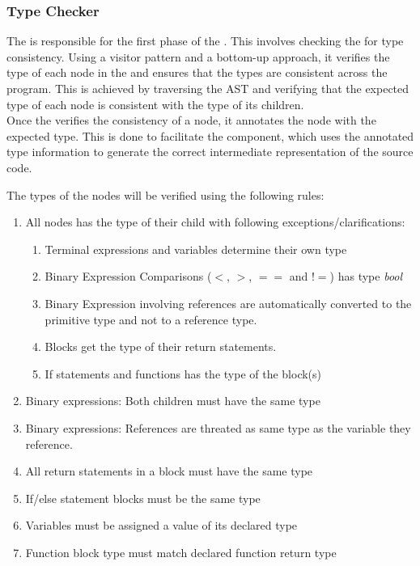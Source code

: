\subsubsection{Type Checker}

The \typeChecker{} is responsible for the first phase of the \static. This involves
checking the \ast{} for type consistency. Using a visitor pattern and a bottom-up
approach, it verifies the type of each node in the \ast{} and ensures that the types
are consistent across the program. This is achieved by traversing the AST and
verifying that the expected type of each node is consistent with the type of its
children. \\

Once the \typeChecker{} verifies the consistency of a node, it annotates the node
with the expected type. This is done to facilitate the \codeGen{} component, which
uses the annotated type information to generate the correct intermediate
representation of the source code.

The types of the nodes will be verified using the following rules:
\begin{enumerate}

\item All nodes has the type of their child with following exceptions/clarifications:
\begin{enumerate}
\item Terminal expressions and variables determine their own type
\item Binary Expression Comparisons ($<$, $>$, $==$ and $!=$) has type \textit{bool}
\item Binary Expression involving references are automatically converted to the primitive type and not to a reference type.
\item Blocks get the type of their return statements. 
\item If statements and functions has the type of the block(s)
\end{enumerate}
\item Binary expressions: Both children must have the same type
\item Binary expressions: References are threated as same type as the
  variable they reference.
\item All return statements in a block must have the same type
\item If/else statement blocks must be the same type
\item Variables must be assigned a value of its declared type
\item Function block type must match declared function return type
\end{enumerate}
